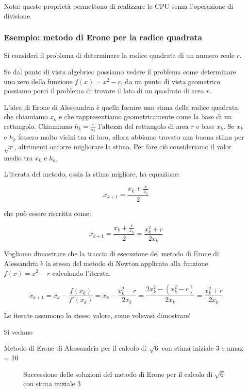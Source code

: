 Nota: queste proprietà permettono di realizzare le CPU senza l'operazione di divisione.


\subsubsection{Esempio: metodo di Erone per la radice quadrata}

Si consideri il problema di determinare la radice quadrata di un numero reale $r$.

Se dal punto di vista algebrico possiamo vedere il problema come determinare uno zero della funzione $f(x) = x^2 - r$,
da un punto di vista geometrico possiamo porci il problema di trovare il lato di un quadrato di area $r$.


L'idea di Erone di Alessandria è quella fornire una stima della radice quadrata, che chiamiamo $x_k$ e che
rappresentiamo geometricamente come la base di un rettangolo. Chiamiamo $h_k = \frac{r}{x_k}$ l'altezza del rettangolo
di area $r$ e base $x_k$.
Se $x_k$ e $h_k$ fossero molto vicini tra di loro, allora abbiamo trovato una buona stima per $\sqrt{r}$, altrimenti
occorre migliorare la stima. Per fare ciò consideriamo il valor medio tra $x_k$ e $h_k$.

L'iterata del metodo, ossia la stima migliore, ha equazione:

$$x_{k+1} = \frac{x_k+\frac{r}{x_k}}{2}$$

che può essere riscritta come:

$$x_{k+1} = \frac{x_k+ \frac{r}{x_k}}{2} = \frac{x_k^2 + r}{2x_k}$$

Vogliamo dimostrare che la traccia di esecuzione del metodo di Erone di Alessandria è la stessa del metodo
di Newton applicato alla funzione $f(x) = x^2 - r$ calcolando l'iterata:

$$x_{k+1} = x_k - \frac{f(x_k)}{f'(x_k)} =
            x_k - \frac{x_k^2 - r}{2 x_k} =
            \frac{2 x_k^2 - ( x_k^2 - r)}{2 x_k} =
            \frac{x_k^2 + r}{2 x_k}$$

Le iterate assumono lo stesso valore, come volevasi dimostrare!

Si vedano 

\begin{table}
    \begin{center}
\end{center}        
\caption[]{Metodo di Erone di Alessandria per il calcolo di $\sqrt{6}$ con stima iniziale 3 e nmax = 10}
\label{tab:erone_sqrt_6}
\end{table}

\begin{figure}[ht]
    \centering
    
    \caption{Successione delle soluzioni del metodo di Erone per il calcolo di $\sqrt{6}$ con stima iniziale 3}
    \label{fig:geo_erone_sqrt_6}
\end{figure}
